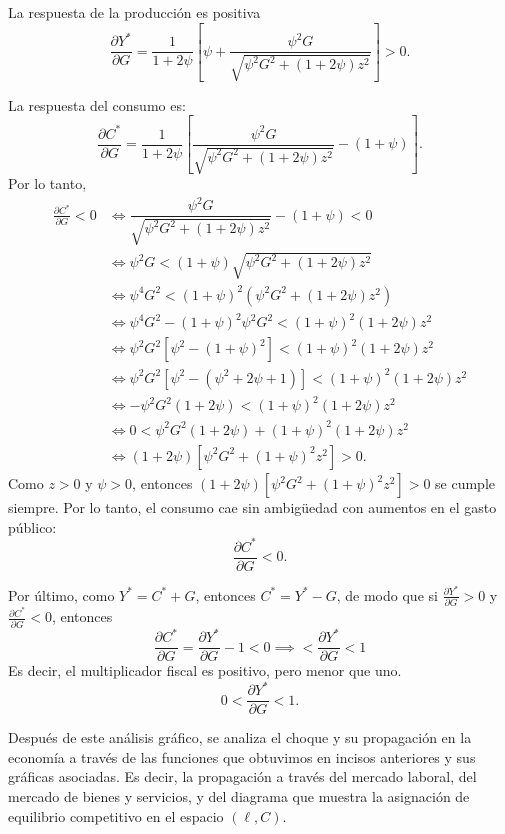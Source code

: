 \documentclass[11pt]{article}
\begin{document}
La respuesta de la producción es positiva
\[
\boxed{
  \frac{\partial Y^*}{\partial G}
  = \frac{
  1}{1+2\psi} \left[
  \psi+\frac{\psi^2G}{\sqrt{\psi^2G^2+(1+2\psi)z^2}}
  \right] >0
}.
\]


La respuesta del consumo es:
\[
  \frac{\partial C^*}{\partial G} 
  =
  \frac{
  1}{1+2\psi} \left[
  \dfrac{\psi^2G}{\sqrt{\psi^2G^2+(1+2\psi)z^2}}
  -(1+\psi)
  \right].
\]
Por lo tanto,
\begin{align*}
  \frac{\partial C^*}{\partial G} < 0 
  &\iff 
  \dfrac{\psi^2G}{\sqrt{\psi^2G^2+(1+2\psi)z^2}}
  -(1+\psi) < 0 \\
  &\iff 
  \psi^2G < (1+\psi)\sqrt{\psi^2G^2+(1+2\psi)z^2} \\
  &\iff 
  \psi^4 G^2 < (1+\psi)^2\left(\psi^2G^2+(1+2\psi)z^2\right) \\
  &\iff 
  \psi^4 G^2 - (1+\psi)^2\psi^2 G^2 < (1+\psi)^2(1+2\psi) z^2 \\
  &\iff 
  \psi^2 G^2\left[\psi^2 - (1+\psi)^2\right] < (1+\psi)^2(1+2\psi) z^2 \\
  &\iff 
  \psi^2 G^2\left[\psi^2 - (\psi^2 + 2 \psi + 1)\right] < (1+\psi)^2(1+2\psi) z^2 \\
  &\iff 
  -\psi^2 G^2 (1+2\psi) < (1+\psi)^2(1+2\psi) z^2 \\
  &\iff 
  0< \psi^2 G^2 (1+2\psi) + (1+\psi)^2(1+2\psi) z^2 \\
  &\iff 
  (1+2\psi)\left[\psi^2 G^2 + (1+\psi)^2 z^2\right] > 0.
\end{align*}
Como $z>0$ y $\psi > 0$, entonces $(1+2\psi)\left[\psi^2 G^2 + (1+\psi)^2 z^2\right] > 0$ se cumple siempre. Por lo tanto, el consumo cae sin ambigüedad con aumentos en el gasto público:
\[
  \boxed{\frac{\partial C^*}{\partial G} < 0.}
\]

Por último, como $Y^* = C^* + G$, entonces $C^* = Y^* - G$, de modo que si $\tfrac{\partial Y^*}{\partial G} >0$ y $\tfrac{\partial C^*}{\partial G} <0$, entonces
\[
\frac{\partial C^*}{\partial G} = \frac{\partial Y^*}{\partial G}  - 1 < 0 \implies  < \frac{\partial Y^*}{\partial G} < 1
\]
Es decir, el multiplicador fiscal es positivo, pero menor que uno.
\[
  \boxed{
  0<\frac{\partial Y^*}{\partial G}<1
  }.
\]

Después de este análisis gráfico, se analiza el choque y su propagación en la economía a través de las funciones que obtuvimos en incisos anteriores y sus gráficas asociadas. Es decir, la propagación a través del mercado laboral, del mercado de bienes y servicios, y del diagrama que muestra la asignación de equilibrio competitivo en el espacio $(\ell, C)$.
\end{document}
